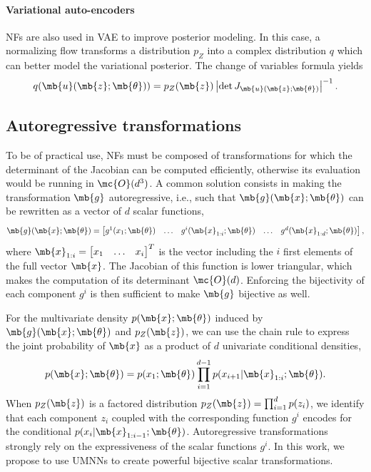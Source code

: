 \paragraph{Variational auto-encoders}
NFs are also used in VAE to improve posterior modeling.
In this case, a normalizing flow transforms a distribution $p_Z$ into a complex distribution $q$ which can better model the variational posterior.
The change of variables formula yields
\begin{equation}
    q(\mb{u}(\mb{z}; \mb{\theta})) = p_Z(\mb{z}) \left|\det J_{\mb{u}(\mb{z};\mb{\theta})} \right|^{-1}.\label{eq:NF_VI}
\end{equation}


\subsection{Autoregressive transformations}

To be of practical use, NFs must be composed of transformations for which the determinant of the Jacobian can be computed efficiently, otherwise its evaluation would be running in $\mc{O} (d^3)$.
A common solution consists in making the transformation $\mb{g}$ autoregressive, i.e., such that $\mb{g}(\mb{x};\mb{\theta})$ can be rewritten as a vector of $d$ scalar functions,
$$ \mb{g}(\mb{x};\mb{\theta}) = \begin{bmatrix}
g^1(x_{1}; \mb{\theta}) & \hdots &  g^i(\mb{x}_{1 : i}; \mb{\theta}) & \hdots & g^d(\mb{x}_{1 : d}; \mb{\theta})
\end{bmatrix}, $$
where $\mb{x}_{1 : i} = \begin{bmatrix} x_1 & \hdots & x_i \end{bmatrix}^T$ is the vector including the $i$ first elements of the full vector $\mb{x}$. The Jacobian of this function is lower triangular, which makes the computation of its determinant $\mc{O}(d)$.
Enforcing the bijectivity of each component $g^i$ is then sufficient to make $\mb{g}$ bijective as well.

For the multivariate density $p(\mb{x}; \mb{\theta})$ induced by $\mb{g}(\mb{x};\mb{\theta})$ and $p_Z(\mb{z})$, we can use the chain rule to express the joint probability of $\mb{x}$ as a product of $d$ univariate conditional densities,
\begin{align}
    p(\mb{x}; \mb{\theta}) = p(x_1; \mb{\theta})\prod^{d-1}_{i=1}p(x_{i+1}|\mb{x}_{1:i}; \mb{\theta}).
\end{align}
When $p_Z(\mb{z})$ is a factored distribution $p_Z(\mb{z}) = \prod^{d}_{i=1}p(z_i)$, we identify that each component $z_i$ coupled with the corresponding function $g^i$ encodes for the conditional $p(x_{i}|\mb{x}_{1:i-1}; \mb{\theta})$.
%
Autoregressive transformations strongly rely on the expressiveness of the scalar functions $g^i$.
In this work, we propose to use UMNNs to create powerful bijective scalar transformations.


